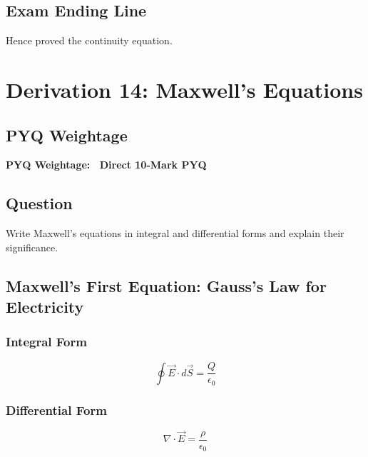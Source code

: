 \documentclass[11pt,a4paper]{article}
\begin{document}
\subsection*{Exam Ending Line}
Hence proved the continuity equation.

\newpage

\section{Derivation 14: Maxwell's Equations}

\subsection*{PYQ Weightage}
\begin{tcolorbox}[colback=yellow!10!white, colframe=orange, halign=center]
    \textbf{PYQ Weightage: \textasteriskcentered\textasteriskcentered\textasteriskcentered\textasteriskcentered\textasteriskcentered\ Direct 10-Mark PYQ}
\end{tcolorbox}

\subsection*{Question}
Write Maxwell's equations in integral and differential forms and explain their significance.

\subsection*{Maxwell's First Equation: Gauss's Law for Electricity}

\subsubsection*{Integral Form}
\begin{tcolorbox}[colback=RoyalBlue!5!white, colframe=RoyalBlue]
    \[ \oint \vec{E} \cdot d\vec{S} = \frac{Q}{\epsilon_0} \]
\end{tcolorbox}

\subsubsection*{Differential Form}
\begin{tcolorbox}[colback=RoyalBlue!5!white, colframe=RoyalBlue]
    \[ \nabla \cdot \vec{E} = \frac{\rho}{\epsilon_0} \]
\end{tcolorbox}
\end{document}

